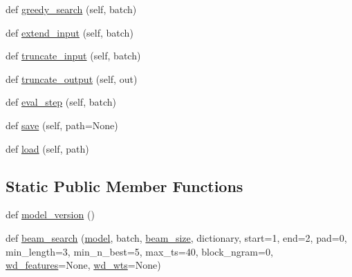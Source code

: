 \begin{DoxyCompactItemize}
\item 
def \hyperlink{classcontrollable__seq2seq_1_1controllable__seq2seq_1_1ControllableSeq2seqAgent_a5cbdb2b3630855612a695f82880b763b}{greedy\+\_\+search} (self, batch)
\item 
def \hyperlink{classcontrollable__seq2seq_1_1controllable__seq2seq_1_1ControllableSeq2seqAgent_ade83148e3cf61ac4c5149206000584c5}{extend\+\_\+input} (self, batch)
\item 
def \hyperlink{classcontrollable__seq2seq_1_1controllable__seq2seq_1_1ControllableSeq2seqAgent_affad89ae4f723a3127e1a2f282f4565f}{truncate\+\_\+input} (self, batch)
\item 
def \hyperlink{classcontrollable__seq2seq_1_1controllable__seq2seq_1_1ControllableSeq2seqAgent_a9f1de6132ddaf0b2c9a197617e08eac6}{truncate\+\_\+output} (self, out)
\item 
def \hyperlink{classcontrollable__seq2seq_1_1controllable__seq2seq_1_1ControllableSeq2seqAgent_a600aa2aca5941966727a8e02bb0430a3}{eval\+\_\+step} (self, batch)
\item 
def \hyperlink{classcontrollable__seq2seq_1_1controllable__seq2seq_1_1ControllableSeq2seqAgent_abc818803e27d99525704db33cd4dd928}{save} (self, path=None)
\item 
def \hyperlink{classcontrollable__seq2seq_1_1controllable__seq2seq_1_1ControllableSeq2seqAgent_a86c91e473f1a1d2345aa70658f0acbeb}{load} (self, path)
\end{DoxyCompactItemize}
\subsection*{Static Public Member Functions}
\begin{DoxyCompactItemize}
\item 
def \hyperlink{classcontrollable__seq2seq_1_1controllable__seq2seq_1_1ControllableSeq2seqAgent_a8995fe4b50a61a5b6c139d26dbb57ca2}{model\+\_\+version} ()
\item 
def \hyperlink{classcontrollable__seq2seq_1_1controllable__seq2seq_1_1ControllableSeq2seqAgent_a9de6e4414354c8e879ea51231e44242e}{beam\+\_\+search} (\hyperlink{classcontrollable__seq2seq_1_1controllable__seq2seq_1_1ControllableSeq2seqAgent_ac0b211cd03b70ac7fc886d7a7f9c21ef}{model}, batch, \hyperlink{classcontrollable__seq2seq_1_1controllable__seq2seq_1_1ControllableSeq2seqAgent_a96273b52624567e93472a4843628824e}{beam\+\_\+size}, dictionary, start=1, end=2, pad=0, min\+\_\+length=3, min\+\_\+n\+\_\+best=5, max\+\_\+ts=40, block\+\_\+ngram=0, \hyperlink{classcontrollable__seq2seq_1_1controllable__seq2seq_1_1ControllableSeq2seqAgent_ac61834ee9c45f969e72587fbdb25b94b}{wd\+\_\+features}=None, \hyperlink{classcontrollable__seq2seq_1_1controllable__seq2seq_1_1ControllableSeq2seqAgent_ad71d774c8cadd949e016a647356a8b02}{wd\+\_\+wts}=None)
\end{DoxyCompactItemize}
